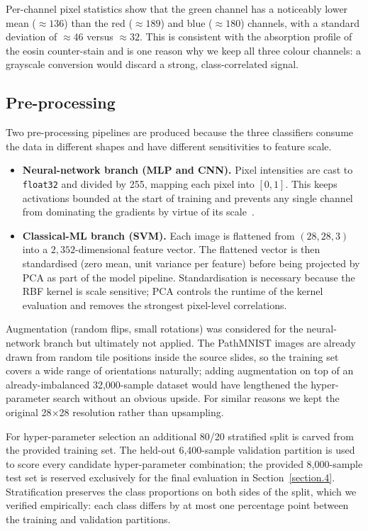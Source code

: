 \documentclass[../main.tex]{subfiles}
\begin{document}
\noindent
Per-channel pixel statistics show that the green channel has a noticeably
lower mean ($\approx 136$) than the red ($\approx 189$) and blue ($\approx
180$) channels, with a standard deviation of $\approx 46$ versus $\approx
32$. This is consistent with the absorption profile of the eosin
counter-stain and is one reason why we keep all three colour channels: a
grayscale conversion would discard a strong, class-correlated signal.

\subsection{Pre-processing}
\noindent
Two pre-processing pipelines are produced because the three classifiers
consume the data in different shapes and have different sensitivities to
feature scale.

\begin{itemize}
    \item \textbf{Neural-network branch (\gls{MLP} and \gls{CNN}).} Pixel
    intensities are cast to \texttt{float32} and divided by 255, mapping
    each pixel into $[0, 1]$. This keeps activations bounded at the start
    of training and prevents any single channel from dominating the
    gradients by virtue of its scale~\cite{lecun2012efficient}.
    \item \textbf{Classical-ML branch (\gls{SVM}).} Each image is flattened
    from $(28, 28, 3)$ into a $2{,}352$-dimensional feature vector. The
    flattened vector is then standardised (zero mean, unit variance per
    feature) before being projected by \gls{PCA} as part of the model
    pipeline. Standardisation is necessary because the \gls{RBF} kernel is
    scale sensitive; \gls{PCA} controls the runtime of the kernel
    evaluation and removes the strongest pixel-level correlations.
\end{itemize}

\noindent
Augmentation (random flips, small rotations) was considered for the
neural-network branch but ultimately not applied. The PathMNIST images are
already drawn from random tile positions inside the source slides, so the
training set covers a wide range of orientations naturally; adding
augmentation on top of an already-imbalanced 32{,}000-sample dataset would
have lengthened the hyper-parameter search without an obvious upside. For
similar reasons we kept the original 28$\times$28 resolution rather than
upsampling.

\noindent
For hyper-parameter selection an additional 80/20 stratified split is
carved from the provided training set. The held-out 6{,}400-sample
validation partition is used to score every candidate hyper-parameter
combination; the provided 8{,}000-sample test set is reserved exclusively
for the final evaluation in Section~\ref{section.4}. Stratification preserves
the class proportions on both sides of the split, which we verified
empirically: each class differs by at most one percentage point between the
training and validation partitions.
\end{document}
